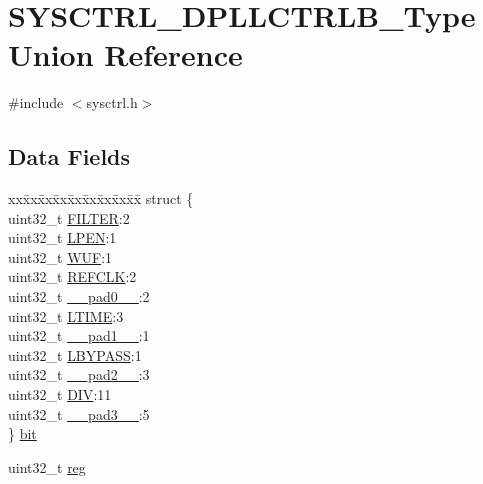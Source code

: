 \hypertarget{union_s_y_s_c_t_r_l___d_p_l_l_c_t_r_l_b___type}{}\section{S\+Y\+S\+C\+T\+R\+L\+\_\+\+D\+P\+L\+L\+C\+T\+R\+L\+B\+\_\+\+Type Union Reference}
\label{union_s_y_s_c_t_r_l___d_p_l_l_c_t_r_l_b___type}


{\ttfamily \#include $<$sysctrl.\+h$>$}

\subsection*{Data Fields}
\begin{DoxyCompactItemize}
\item 
\begin{tabbing}
xx\=xx\=xx\=xx\=xx\=xx\=xx\=xx\=xx\=\kill
struct \{\\
\>uint32\_t \mbox{\hyperlink{union_s_y_s_c_t_r_l___d_p_l_l_c_t_r_l_b___type_a5f310f83f40110ac5fa4e621fd75beea}{FILTER}}:2\\
\>uint32\_t \mbox{\hyperlink{union_s_y_s_c_t_r_l___d_p_l_l_c_t_r_l_b___type_a6664466d212f957ee97dd9d053b80df4}{LPEN}}:1\\
\>uint32\_t \mbox{\hyperlink{union_s_y_s_c_t_r_l___d_p_l_l_c_t_r_l_b___type_afa2323ca402dcfe96d75760d3fc651fa}{WUF}}:1\\
\>uint32\_t \mbox{\hyperlink{union_s_y_s_c_t_r_l___d_p_l_l_c_t_r_l_b___type_aa911f9c8abc2ce14895d6839ef7e0c79}{REFCLK}}:2\\
\>uint32\_t \mbox{\hyperlink{union_s_y_s_c_t_r_l___d_p_l_l_c_t_r_l_b___type_a3e57c2ef1c3ffb36722f000cc1156824}{\_\_pad0\_\_}}:2\\
\>uint32\_t \mbox{\hyperlink{union_s_y_s_c_t_r_l___d_p_l_l_c_t_r_l_b___type_a81229895c0ce4fa0924ae87460cfeb59}{LTIME}}:3\\
\>uint32\_t \mbox{\hyperlink{union_s_y_s_c_t_r_l___d_p_l_l_c_t_r_l_b___type_a6712ba6dd1d5b43d2d56ff8ac4e275a7}{\_\_pad1\_\_}}:1\\
\>uint32\_t \mbox{\hyperlink{union_s_y_s_c_t_r_l___d_p_l_l_c_t_r_l_b___type_a473d0afa8a5688cc2367f13279bc28c6}{LBYPASS}}:1\\
\>uint32\_t \mbox{\hyperlink{union_s_y_s_c_t_r_l___d_p_l_l_c_t_r_l_b___type_a9ce12a63de64ef64ae2d59d128251cae}{\_\_pad2\_\_}}:3\\
\>uint32\_t \mbox{\hyperlink{union_s_y_s_c_t_r_l___d_p_l_l_c_t_r_l_b___type_a0d52084cbd3830501e344b05e6215b94}{DIV}}:11\\
\>uint32\_t \mbox{\hyperlink{union_s_y_s_c_t_r_l___d_p_l_l_c_t_r_l_b___type_a4854608c0e776f0704a4d9a4b98ea57d}{\_\_pad3\_\_}}:5\\
\} \mbox{\hyperlink{union_s_y_s_c_t_r_l___d_p_l_l_c_t_r_l_b___type_a09e37277aebf6d6540be8c764e401d08}{bit}}\\

\end{tabbing}\item 
uint32\+\_\+t \mbox{\hyperlink{union_s_y_s_c_t_r_l___d_p_l_l_c_t_r_l_b___type_a6b91636401516a477989a336376d7b40}{reg}}
\end{DoxyCompactItemize}


